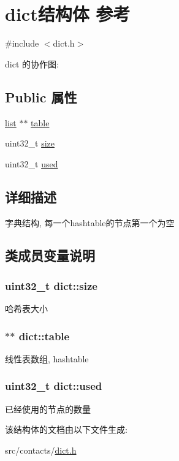 \hypertarget{structdict}{}\section{dict结构体 参考}
\label{structdict}


{\ttfamily \#include $<$dict.\+h$>$}



dict 的协作图\+:
\subsection*{Public 属性}
\begin{DoxyCompactItemize}
\item 
\hyperlink{structlist}{list} $\ast$$\ast$ \hyperlink{structdict_a337bb4468f938b34de9173822a143b80}{table}
\item 
uint32\+\_\+t \hyperlink{structdict_a23a3a7a6a87615513d9f8f90eadb5ead}{size}
\item 
uint32\+\_\+t \hyperlink{structdict_abd9079c1d7e55aee509c93f4239f5690}{used}
\end{DoxyCompactItemize}


\subsection{详细描述}
字典结构, 每一个hashtable的节点第一个为空 

\subsection{类成员变量说明}
\subsubsection[{\texorpdfstring{size}{size}}]{\setlength{\rightskip}{0pt plus 5cm}uint32\+\_\+t dict\+::size}\hypertarget{structdict_a23a3a7a6a87615513d9f8f90eadb5ead}{}\label{structdict_a23a3a7a6a87615513d9f8f90eadb5ead}
哈希表大小 
\subsubsection[{\texorpdfstring{table}{table}}]{$\ast$$\ast$ dict\+::table}\hypertarget{structdict_a337bb4468f938b34de9173822a143b80}{}\label{structdict_a337bb4468f938b34de9173822a143b80}
线性表数组, hashtable 
\subsubsection[{\texorpdfstring{used}{used}}]{\setlength{\rightskip}{0pt plus 5cm}uint32\+\_\+t dict\+::used}\hypertarget{structdict_abd9079c1d7e55aee509c93f4239f5690}{}\label{structdict_abd9079c1d7e55aee509c93f4239f5690}
已经使用的节点的数量 

该结构体的文档由以下文件生成\+:\begin{DoxyCompactItemize}
\item 
src/contacts/\hyperlink{dict_8h}{dict.\+h}\end{DoxyCompactItemize}
